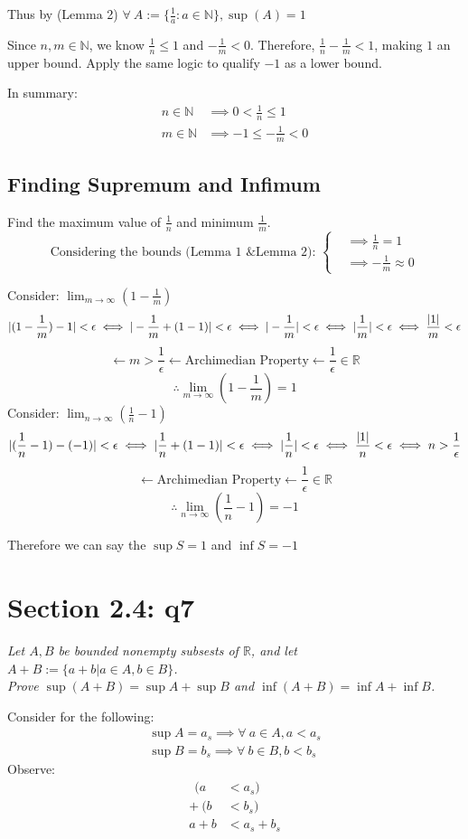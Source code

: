 \documentclass[11pt]{article}
\newcommand{\question}[1]{
    \begin{mdframed}[
        linecolor=gray,       %
        linewidth=0.5pt,      %
        innertopmargin=10pt,  %
        innerbottommargin=10pt %
    ]
    \centering \itshape \color{gray} #1
    \end{mdframed}
}
\theoremstyle{plain}
\begin{document}
Thus by (Lemma 2) $\forall ~A := \{ \frac{1}{a} : a \in \mathbb{N} \}, \sup(A) = 1$

Since $n,m \in \mathbb{N}$, we know $\frac{1}{n} \leq 1$ and $-\frac{1}{m} < 0$. Therefore, $\frac{1}{n} - \frac{1}{m} < 1$, making $1$ an upper bound. Apply the same logic to qualify $-1$ as a lower bound.

In summary:
\[
	\begin{aligned}
		n \in \mathbb{N} & \implies 0 < \frac{1}{n} \leq 1    \\
		m \in \mathbb{N} & \implies -1 \leq  -\frac{1}{m} < 0
	\end{aligned}
\]


\subsection*{Finding Supremum and Infimum}
Find the maximum value of $\frac{1}{n}$ and minimum $\frac{1}{m}$.
\[
	\text{Considering the bounds (Lemma 1 \& Lemma 2):  }
	\left \{
	\begin{aligned}
		 & \implies \frac{1}{n} = 1        \\
		 & \implies -\frac{1}{m} \approx 0
	\end{aligned}
	\right .
\]

Consider: $\lim_{m \to \infty} (1-\frac{1}{m})$
\[ |(1-\frac{1}{m})-1| < \epsilon \iff |-\frac{1}{m} + (1-1) | < \epsilon \iff |-\frac{1}{m}| < \epsilon \iff |\frac{1}{m}| < \epsilon \iff \frac{|1|}{m} < \epsilon \\ \]
\[ \leftarrow m > \frac{1}{\epsilon}       \leftarrow \text{Archimedian Property}  \leftarrow \frac{1}{\epsilon} \in \mathbb{R} \]
\[ \therefore \lim_{m \to \infty} (1-\frac{1}{m})=1 \]
Consider: $\lim_{n \to \infty} (\frac{1}{n}-1)$
\[ |(\frac{1}{n}-1)-(-1)| < \epsilon \iff |\frac{1}{n}+(1-1)| < \epsilon \iff |\frac{1}{n}| < \epsilon \iff \frac{|1|}{n} < \epsilon \iff n > \frac{1}{\epsilon} \\ \]
\[ \leftarrow \text{Archimedian Property} \leftarrow \frac{1}{\epsilon} \in \mathbb{R} \]
\[ \therefore \lim_{n \to \infty} (\frac{1}{n}-1) = -1 \]

Therefore we can say the $\sup S = 1$ and $\inf S = -1$

\section*{Section 2.4: q7}
\question{ Let $A,B$ be bounded nonempty subsests of $\mathbb{R}$, and let $A+B := \{ a+b | a \in A, b \in B \}$. \\ Prove $\sup(A+B) = \sup A + \sup B$ and $\inf(A+B) = \inf A + \inf B$. }
Consider for the following:
\[
	\begin{aligned}
		\sup A = a_s \implies \forall ~a \in A, a < a_s \\
		\sup B = b_s \implies \forall ~b \in B, b < b_s
	\end{aligned}
\]
Observe:
\[
	\begin{aligned}
		~~(a  & < a_s)      \\
		+ ~(b & < b_s)      \\
		\hline
		a + b & < a_s + b_s
	\end{aligned}
\]
\end{document}
